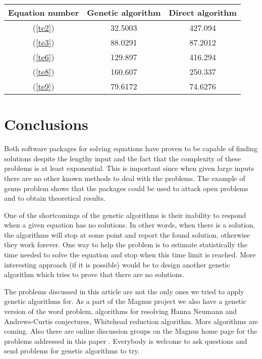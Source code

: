 \documentclass{article}
\begin{document}
\vspace{8mm}
\noindent
\begin{tabular}{|c|c|c|} \hline
Equation number & Genetic algorithm & Direct algorithm \\ \hline
(\ref{te2}) & 32.5003 & 427.094 \\ \hline
(\ref{te3}) & 88.0291 & 87.2012 \\ \hline
(\ref{te6}) & 129.897 & 416.294 \\ \hline
(\ref{te8}) & 160.607 & 250.337 \\ \hline
(\ref{te9}) & 79.6172 & 74.6276 \\ \hline
\end{tabular}
\vspace{8mm}

\section{Conclusions}

Both software packages for solving equations have proven to be capable
of finding solutions despite the lengthy input and the fact that the
complexity of these problems is at least exponential. This is
important since when given large inputs there are no other known
methods to deal with the problems. The example of genus problem shows
that the packages could be used to attack open problems and to obtain
theoretical results.

One of the shortcomings of the genetic algorithms is their inability
to respond when a given equation has no solutions. In other words,
when there is a solution, the algorithms will stop at some point and
report the found solution, otherwise they work forever. One way to
help the problem is to estimate statistically the time needed to solve
the equation and stop when this time limit is reached. More
interesting approach (if it is possible) would be to design another
genetic algorithm which tries to prove that there are no solutions.

The problems discussed in this article are not the only ones we tried
to apply genetic algorithms for. As a part of the Magnus project we
also have a genetic version of the word problem, algorithms for
resolving Hanna Neumann and Andrews-Curtis conjectures, Whitehead
reduction algorithm. More algorithms are coming. Also there are online
discussion groups on the Magnus home page for the problems addressed
in this paper \cite{Magnus}. Everybody is welcome to ask questions
and send problems for genetic algorithms to try.
\end{document}
